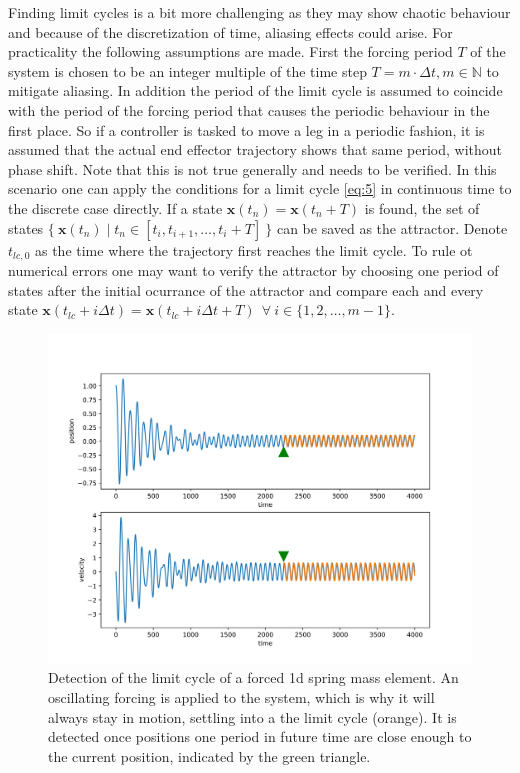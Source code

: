 Finding limit cycles is a bit more challenging as they may show chaotic behaviour and because of the discretization of time, aliasing effects could arise. For practicality the following assumptions are made. 
First the forcing period $T$ of the system is chosen to be an integer multiple of the time step $T = m\cdot \Delta t, m \in \mathbb{N}$ to mitigate aliasing. In addition the period of the limit cycle is assumed to coincide with the period of the forcing period that causes the periodic behaviour in the first place. So if a controller is tasked to move a leg in a periodic fashion, it is assumed that the actual end effector trajectory shows that same period, without phase shift. Note that this is not true generally and needs to be verified. 
In this scenario one can apply the conditions for a limit cycle \ref{eq:5} in continuous time to the discrete case directly.
If a state $\mathbf{x}(t_n) = \mathbf{x}(t_n+T)$ is found, the set of states $\{\ \mathbf{x}(t_n) \mid t_n \in [t_i,t_{i+1},\ldots,t_i+T]\ \}$ can be saved as the attractor. Denote $t_{lc,0}$ as the time where the trajectory first reaches the limit cycle. To rule ot numerical errors one may want to verify the attractor by choosing one period of states after the initial ocurrance of the attractor and compare each and every state $\mathbf{x}(t_{lc}+i\Delta t) = \mathbf{x}(t_{lc}+i\Delta t+T)\ \ \forall\ i \in \{1,2,\ldots, m-1\}$.

\begin{figure}[h]
\centering
\includegraphics[width=.7\textwidth]{figures/limit_cycle_detection.png}
\caption[Limit Cycle Detection]{Detection of the limit cycle of a forced 1d spring mass element. An oscillating forcing is applied to the system, which is why it will always stay in motion, settling into a the limit cycle (orange). It is detected once positions one period in future time are close enough to the current position, indicated by the green triangle.}
\label{lcdet}
\end{figure}

